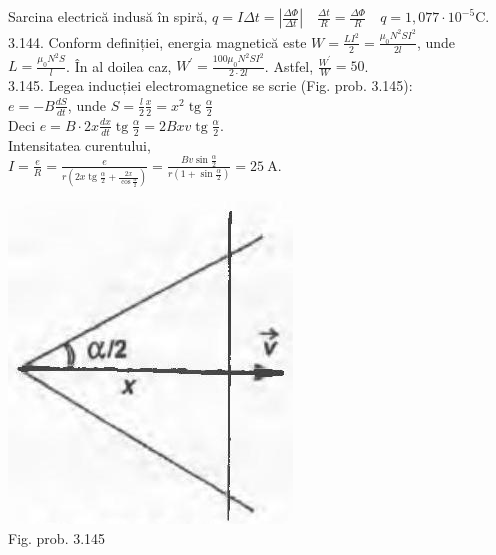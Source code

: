 Sarcina electrică indusă în spiră, $q=I \Delta t=\left|\frac{\Delta \Phi}{\Delta t}\right| \quad \frac{\Delta t}{R}=\frac{\Delta \Phi}{R} \quad q=1,077 \cdot 10^{-5} \mathrm{C}$.\\

3.144. Conform definiției, energia magnetică este $W=\frac{L I^{2}}{2}=\frac{\mu_{0} N^{2} S I^{2}}{2 l}$, unde $L=\frac{\mu_{0} N^{2} S}{l}$. În al doilea caz, $W^{\prime}=\frac{100 \mu_{0} N^{2} S I^{2}}{2 \cdot 2 l}$. Astfel, $\frac{W^{\prime}}{W}=50$.\\

3.145. Legea inducției electromagnetice se scrie (Fig. prob. 3.145):\\ $e=-B \frac{d S}{d t}$, unde $S=\frac{l}{2} \frac{x}{2}=x^{2} \operatorname{tg} \frac{\alpha}{2}$\\ Deci $e=B \cdot 2 x \frac{d x}{d t} \operatorname{tg} \frac{\alpha}{2}=2 B x v \operatorname{tg} \frac{\alpha}{2}$.\\ Intensitatea curentului,\\ $I=\frac{e}{R}=\frac{e}{r\left(2 x \operatorname{tg} \frac{\alpha}{2}+\frac{2 x}{\cos \frac{\alpha}{2}}\right)}=\frac{B v \sin \frac{\alpha}{2}}{r\left(1+\sin \frac{\alpha}{2}\right)}=25 \mathrm{~A} $.\\ \begin{center} \includegraphics[max width=\textwidth]{images/2025_07_01_5b3ff9fa0d508c8e9f17g-370}\\ Fig. prob. 3.145 \end{center}\\

